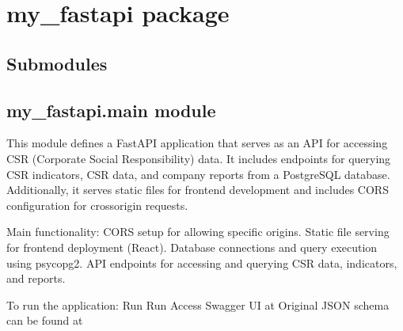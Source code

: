 \documentclass[letterpaper,10pt,english]{sphinxmanual}
\begin{document}
\chapter{my\_fastapi package}
\label{\detokenize{my_fastapi:my-fastapi-package}}\label{\detokenize{my_fastapi::doc}}

\section{Submodules}
\label{\detokenize{my_fastapi:submodules}}

\section{my\_fastapi.main module}
\label{\detokenize{my_fastapi:module-my_fastapi.main}}\label{\detokenize{my_fastapi:my-fastapi-main-module}}
\sphinxAtStartPar
This module defines a FastAPI application that serves as an API for accessing CSR (Corporate Social Responsibility) data.
It includes endpoints for querying CSR indicators, CSR data, and company reports from a PostgreSQL database.
Additionally, it serves static files for frontend development and includes CORS configuration for cross\sphinxhyphen{}origin requests.

\sphinxAtStartPar
Main functionality:
\sphinxhyphen{} CORS setup for allowing specific origins.
\sphinxhyphen{} Static file serving for frontend deployment (React).
\sphinxhyphen{} Database connections and query execution using psycopg2.
\sphinxhyphen{} API endpoints for accessing and querying CSR data, indicators, and reports.

\sphinxAtStartPar
To run the application:
\sphinxhyphen{} Run 
\sphinxhyphen{} Run 
\sphinxhyphen{} Access Swagger UI at 
\sphinxhyphen{} Original JSON schema can be found at 
\end{document}
